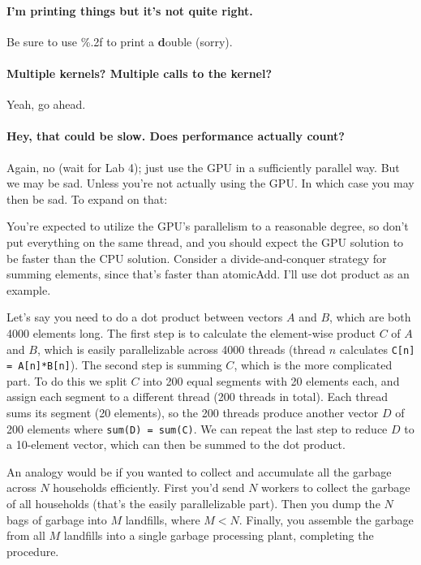 \paragraph{I'm printing things but it's not quite right.} Be sure to use \%.2f to print a \textbf{d}ouble (sorry).

\paragraph{Multiple kernels? Multiple calls to the kernel?} Yeah, go ahead.

\paragraph{Hey, that could be slow. Does performance actually count?} Again, no (wait for Lab 4); just use the GPU in a sufficiently parallel way. But we may be sad. Unless you're not actually using the GPU. In which case you may then be sad. To expand on that:

You're expected to utilize the GPU's parallelism to a reasonable degree, so don't put everything on the same thread, and you should expect the GPU solution to be faster than the CPU solution. Consider a divide-and-conquer strategy for summing elements, since that's faster than atomicAdd. I'll use dot product as an example.

Let's say you need to do a dot product between vectors $A$ and $B$, which are both 4000 elements long. The first step is to calculate the element-wise product $C$ of $A$ and $B$, which is easily parallelizable across 4000 threads (thread $n$ calculates \texttt{C[n] = A[n]*B[n]}). The second step is summing $C$, which is the more complicated part. To do this we split $C$ into 200 equal segments with 20 elements each, and assign each segment to a different thread (200 threads in total). Each thread sums its segment (20 elements), so the 200 threads produce another vector $D$ of 200 elements where \texttt{sum(D) = sum(C)}. We can repeat the last step to reduce $D$ to a 10-element vector, which can then be summed to the dot product.

An analogy would be if you wanted to collect and accumulate all the garbage across $N$ households efficiently. First you'd send $N$ workers to collect the garbage of all households (that's the easily parallelizable part). Then you dump the $N$ bags of garbage into $M$ landfills, where $M < N$. Finally, you assemble the garbage from all $M$ landfills into a single garbage processing plant, completing the procedure.


